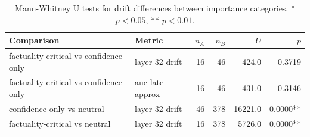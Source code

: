 \begin{table}[h]
\centering\small
\begin{tabular}{llrrrr}
\toprule
Comparison & Metric & $n_A$ & $n_B$ & $U$ & $p$ \\
\midrule
  factuality-critical vs confidence-only & layer 32 drift & 16 & 46 & 424.0 & 0.3719 \\
  factuality-critical vs confidence-only & auc late approx & 16 & 46 & 431.0 & 0.3146 \\
  confidence-only vs neutral & layer 32 drift & 46 & 378 & 16221.0 & 0.0000** \\
  factuality-critical vs neutral & layer 32 drift & 16 & 378 & 5726.0 & 0.0000** \\
\bottomrule
\end{tabular}
\caption{Mann-Whitney U tests for drift differences between importance categories. * $p < 0.05$, ** $p < 0.01$.}
\label{tab:e4_mechanistic_tests}
\end{table}
